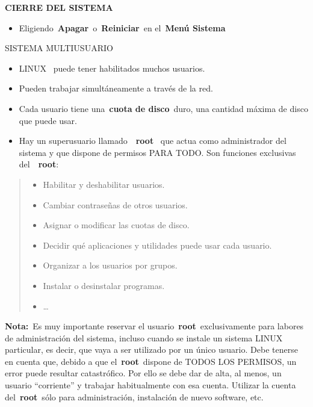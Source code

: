 \documentclass[
  letterpaper,
]{article}
\providecommand{\tightlist}{%
  \setlength{\itemsep}{0pt}\setlength{\parskip}{0pt}}\usepackage{longtable,booktabs,array}
\begin{document}
\textbf{CIERRE DEL SISTEMA}

\begin{itemize}
\tightlist
\item
  Eligiendo~\textbf{Apagar}~o~\textbf{Reiniciar}~en el~\textbf{Menú
  Sistema}
\end{itemize}

SISTEMA MULTIUSUARIO

\begin{itemize}
\tightlist
\item
  LINUX~ puede tener habilitados muchos usuarios.
\item
  Pueden trabajar simultáneamente a través de la red.
\item
  Cada usuario tiene una~\textbf{cuota de disco}~duro, una cantidad
  máxima de disco que puede usar.
\item
  Hay un superusuario llamado~~\textbf{root}~ que actua como
  administrador del sistema y que dispone de permisos PARA TODO. Son
  funciones exclusivas del~~\textbf{root}:
\end{itemize}

\begin{quote}
\begin{itemize}
\tightlist
\item
  Habilitar y deshabilitar usuarios.
\item
  Cambiar contraseñas de otros usuarios.
\item
  Asignar o modificar las cuotas de disco.
\item
  Decidir qué aplicaciones y utilidades puede usar cada usuario.
\item
  Organizar a los usuarios por grupos.
\item
  Instalar o desinstalar programas.
\item
  \ldots{}
\end{itemize}
\end{quote}

\textbf{Nota:}~Es muy importante reservar el
usuario~\textbf{root}~exclusivamente para labores de administración del
sistema, incluso cuando se instale un sistema LINUX particular, es
decir, que vaya a ser utilizado por un único usuario. Debe tenerse en
cuenta que, debido a que el~\textbf{root}~dispone de TODOS LOS PERMISOS,
un error puede resultar catastrófico. Por ello se debe dar de alta, al
menos, un usuario ``corriente'' y trabajar habitualmente con esa cuenta.
Utilizar la cuenta del~\textbf{root}~sólo para administración,
instalación de nuevo software, etc.
\end{document}
